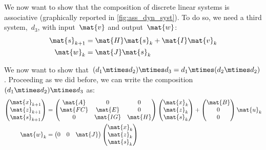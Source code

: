 We now want to show that the composition of discrete linear systems is associative (graphically reported in \cref{fig:ass_dyn_syst}). To do so, we need a third system,~$d_3$, with input~$\mat{v}$ and output~$\mat{w}$:
\begin{equation*}
    \label{eq:dlin-4}
    \begin{aligned}
        \mat{s}_{k+1} &= \mat{H} \mat{s}_k + \mat{I} \mat{v}_k \\
        \mat{w}_{k}   &= \mat{J} \mat{s}_k
    \end{aligned}
\end{equation*}

We now want to show that~$(d_1\mtimes d_2)\mtimes d_3=d_1\mtimes (d_2\mtimes d_2)$.
Proceeding as we did before, we can write the composition~$(d_1\mtimes d_2)\mtimes d_3$ as:
\begin{equation*}
    \label{eq:dlin-5}
    \begin{aligned}
        \begin{pmatrix}
            \mat{x}_{k+1} \\
            \mat{z}_{k+1} \\
            \mat{s}_{k+1}
        \end{pmatrix}&=
        \begin{pmatrix}
            \mat{A}  & 0        & 0       \\
            \mat{FC} & \mat{E}  & 0       \\
            0        & \mat{IG} & \mat{H}
        \end{pmatrix}\begin{pmatrix}
                         \mat{x}_k\\ \mat{z}_k\\ \mat{s}_k
        \end{pmatrix}+
        \begin{pmatrix}
            \mat{B}\\ 0\\ 0
        \end{pmatrix}\mat{u}_k\\
        \mat{w}_k&=\begin{pmatrix}
                       0& 0& \mat{J}
        \end{pmatrix}\begin{pmatrix}
                         \mat{x}_k\\ \mat{z}_k\\ \mat{s}_k
        \end{pmatrix}
    \end{aligned}
\end{equation*}
